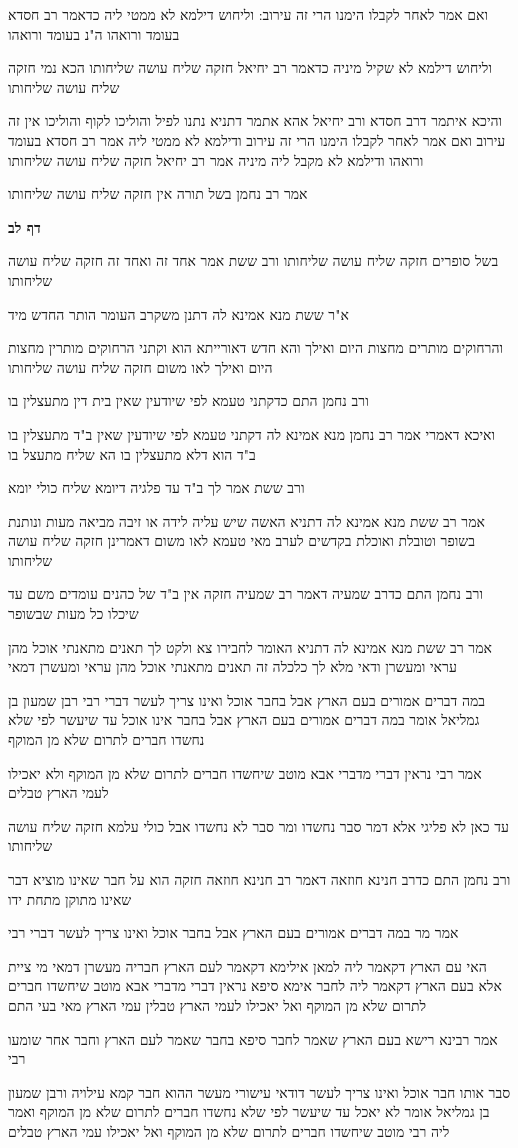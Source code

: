 \documentclass[12pt, openany]{book}
\newcommand{\sethebfont}{
\fontsize{10.5pt}{21.0pt} \selectfont
}
\newcommand{\textblock}[1]{
{\sethebfont #1\\}	
}
\newcommand{\sectname}{}
\newcommand{\newsection}[1]{
	\addcontentsline{toc}{section}{#1}
	\renewcommand{\sectname}{#1}	
	\vspace{-\baselineskip}
	\begin{center}
		\textbf{%
\fontsize{16pt}{16pt}\selectfont
			#1}
	\end{center}
	\vspace{-\baselineskip}
	\nopagebreak
}
\begin{document}
\textblock{ואם אמר לאחר לקבלו הימנו הרי זה עירוב: וליחוש דילמא לא ממטי ליה כדאמר רב חסדא בעומד ורואהו ה"נ בעומד ורואהו}
\textblock{וליחוש דילמא לא שקיל מיניה כדאמר רב יחיאל חזקה שליח עושה שליחותו הכא נמי חזקה שליח עושה שליחותו}
\textblock{והיכא איתמר דרב חסדא ורב יחיאל אהא אתמר דתניא נתנו לפיל והוליכו לקוף והוליכו אין זה עירוב ואם אמר לאחר לקבלו הימנו הרי זה עירוב ודילמא לא ממטי ליה אמר רב חסדא בעומד ורואהו ודילמא לא מקבל ליה מיניה אמר רב יחיאל חזקה שליח עושה שליחותו}
\textblock{אמר רב נחמן בשל תורה אין חזקה שליח עושה שליחותו}
\newsection{דף לב}
\textblock{בשל סופרים חזקה שליח עושה שליחותו ורב ששת אמר אחד זה ואחד זה חזקה שליח עושה שליחותו}
\textblock{א"ר ששת מנא אמינא לה דתנן משקרב העומר הותר החדש מיד}
\textblock{והרחוקים מותרים מחצות היום ואילך והא חדש דאורייתא הוא וקתני הרחוקים מותרין מחצות היום ואילך לאו משום חזקה שליח עושה שליחותו}
\textblock{ורב נחמן התם כדקתני טעמא לפי שיודעין שאין בית דין מתעצלין בו}
\textblock{ואיכא דאמרי אמר רב נחמן מנא אמינא לה דקתני טעמא לפי שיודעין שאין ב"ד מתעצלין בו ב"ד הוא דלא מתעצלין בו הא שליח מתעצל בו}
\textblock{ורב ששת אמר לך ב"ד עד פלגיה דיומא שליח כולי יומא}
\textblock{אמר רב ששת מנא אמינא לה דתניא האשה שיש עליה לידה או זיבה מביאה מעות ונותנת בשופר וטובלת ואוכלת בקדשים לערב מאי טעמא לאו משום דאמרינן חזקה שליח עושה שליחותו}
\textblock{ורב נחמן התם כדרב שמעיה דאמר רב שמעיה חזקה אין ב"ד של כהנים עומדים משם עד שיכלו כל מעות שבשופר}
\textblock{אמר רב ששת מנא אמינא לה דתניא האומר לחבירו צא ולקט לך תאנים מתאנתי אוכל מהן עראי ומעשרן ודאי מלא לך כלכלה זה תאנים מתאנתי אוכל מהן עראי ומעשרן דמאי}
\textblock{במה דברים אמורים בעם הארץ אבל בחבר אוכל ואינו צריך לעשר דברי רבי רבן שמעון בן גמליאל אומר במה דברים אמורים בעם הארץ אבל בחבר אינו אוכל עד שיעשר לפי שלא נחשדו חברים לתרום שלא מן המוקף}
\textblock{אמר רבי נראין דברי מדברי אבא מוטב שיחשדו חברים לתרום שלא מן המוקף ולא יאכילו לעמי הארץ טבלים}
\textblock{עד כאן לא פליגי אלא דמר סבר נחשדו ומר סבר לא נחשדו אבל כולי עלמא חזקה שליח עושה שליחותו}
\textblock{ורב נחמן התם כדרב חנינא חוזאה דאמר רב חנינא חוזאה חזקה הוא על חבר שאינו מוציא דבר שאינו מתוקן מתחת ידו}
\textblock{אמר מר במה דברים אמורים בעם הארץ אבל בחבר אוכל ואינו צריך לעשר דברי רבי}
\textblock{האי עם הארץ דקאמר ליה למאן אילימא דקאמר לעם הארץ חבריה מעשרן דמאי מי ציית אלא בעם הארץ דקאמר ליה לחבר אימא סיפא נראין דברי מדברי אבא מוטב שיחשדו חברים לתרום שלא מן המוקף ואל יאכילו לעמי הארץ טבלין עמי הארץ מאי בעי התם}
\textblock{אמר רבינא רישא בעם הארץ שאמר לחבר סיפא בחבר שאמר לעם הארץ וחבר אחר שומעו רבי}
\textblock{סבר אותו חבר אוכל ואינו צריך לעשר דודאי עישורי מעשר ההוא חבר קמא עילויה ורבן שמעון בן גמליאל אומר לא יאכל עד שיעשר לפי שלא נחשדו חברים לתרום שלא מן המוקף ואמר ליה רבי מוטב שיחשדו חברים לתרום שלא מן המוקף ואל יאכילו עמי הארץ טבלים}
\end{document}
